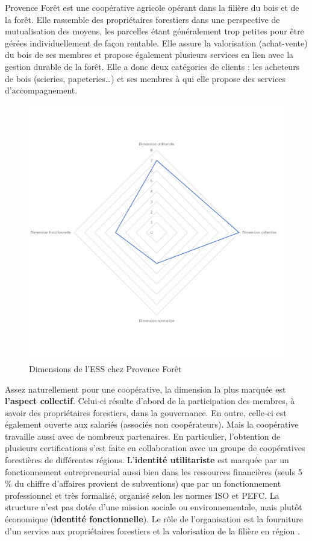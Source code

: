         Provence Forêt est une coopérative agricole opérant dans la filière du bois et de la forêt. Elle rassemble des propriétaires forestiers dans une perspective de mutualisation des moyens, les parcelles étant généralement trop petites pour être gérées individuellement de façon rentable. Elle assure la valorisation (achat-vente) du bois de ses membres et propose également plusieurs services en lien avec la gestion durable de la forêt. Elle a donc deux catégories de clients : les acheteurs de bois (scieries, papeteries…) et ses membres à qui elle propose des services d’accompagnement.

        \begin{figure}[h]
            \caption{Dimensions de l'ESS chez Provence Forêt}
            \label{figure:dimprovenceforet}
            \includegraphics[width=\linewidth]{fig/radars/PF.png}
        \end{figure}
        Assez naturellement pour une coopérative, la dimension la plus marquée est \textbf{l’aspect collectif}. Celui-ci résulte d’abord de la participation des membres, à savoir des propriétaires forestiers, dans la gouvernance. En outre, celle-ci est également ouverte aux salariés (associés non coopérateurs). Mais la coopérative travaille aussi avec de nombreux partenaires. En particulier, l’obtention de plusieurs certifications s’est faite en collaboration avec un groupe de coopératives forestières de différentes régions. L'\textbf{identité utilitariste} est marquée par un fonctionnement entrepreneurial aussi bien dans les ressources financières (seuls 5 \% du chiffre d’affaires provient de subventions) que par un fonctionnement professionnel et très formalisé, organisé selon les normes ISO et PEFC. La structure n'est pas dotée d'une mission sociale ou environnementale, mais plutôt économique (\textbf{identité fonctionnelle}). Le rôle de l'organisation est la fourniture d'un service aux propriétaires forestiers et la valorisation de la filière en région \paca.
